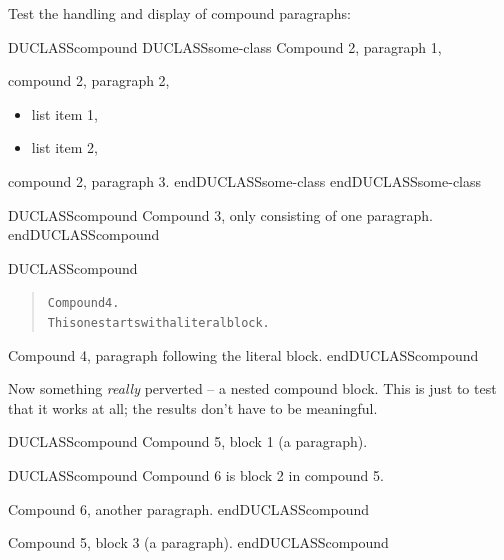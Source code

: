 \documentclass[a4paper]{article}
\newenvironment{DUclass}[1]%
    {%
     \def\DocutilsClassFunctionName{DUCLASS#1}
     \csname \DocutilsClassFunctionName \endcsname}%
    {\csname end\DocutilsClassFunctionName \endcsname}%
\begin{document}
Test the handling and display of compound paragraphs:

\begin{DUclass}{compound}
\begin{DUclass}{some-class}
Compound 2, paragraph 1,

compound 2, paragraph 2,
\begin{itemize}
\item list item 1,

\item list item 2,
\end{itemize}
compound 2, paragraph 3.
\end{DUclass}
\end{DUclass}

\begin{DUclass}{compound}
Compound 3, only consisting of one paragraph.
\end{DUclass}

\begin{DUclass}{compound}
\begin{quote}
\begin{alltt}
Compound 4.
This one starts with a literal block.
\end{alltt}
\end{quote}
Compound 4, paragraph following the literal block.
\end{DUclass}

Now something \emph{really} perverted – a nested compound block.  This is
just to test that it works at all; the results don’t have to be
meaningful.

\begin{DUclass}{compound}
Compound 5, block 1 (a paragraph).

\begin{DUclass}{compound}
Compound 6 is block 2 in compound 5.

Compound 6, another paragraph.
\end{DUclass}

Compound 5, block 3 (a paragraph).
\end{DUclass}
\end{document}
